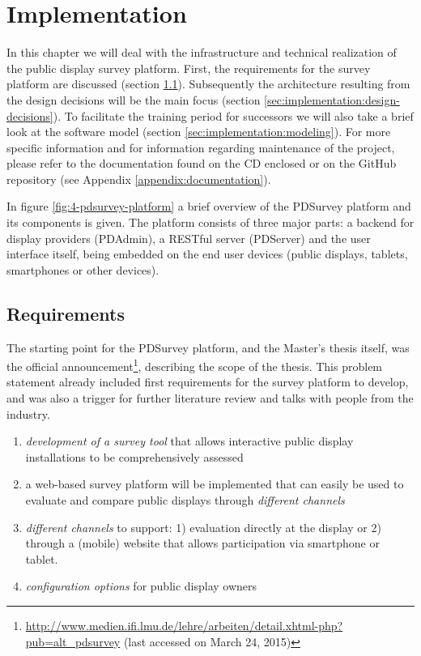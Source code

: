 \section{Implementation}
\label{chapter:implementation}
\label{sec:implementation}

	In this chapter we will deal with the infrastructure and technical realization of the public display survey platform. First, the requirements for the survey platform are discussed (section \ref{sec:implementation:requirements}). Subsequently the architecture resulting from the design decisions will be the main focus (section \ref{sec:implementation:design-decisions}). To facilitate the training period for successors we will also take a brief look at the software model (section \ref{sec:implementation:modeling}). For more specific information and for information regarding maintenance of the project, please refer to the documentation found on the CD enclosed or on the GitHub repository (see Appendix \ref{appendix:documentation}).

	In figure \ref{fig:4-pdsurvey-platform} a brief overview of the PDSurvey platform and its components is given. The platform consists of three major parts: a backend for display providers (PDAdmin), a RESTful server (PDServer) and the user interface itself, being embedded on the end user devices (public displays, tablets, smartphones or other devices). 





\subsection{Requirements}
\label{sec:implementation:requirements}

	The starting point for the PDSurvey platform, and the Master's thesis itself, was the official announcement\footnote{\url{http://www.medien.ifi.lmu.de/lehre/arbeiten/detail.xhtml-php?pub=alt_pdsurvey} (last accessed on March 24, 2015)}, describing the scope of the thesis. This problem statement already included first requirements for the survey platform to develop, and was also a trigger for further literature review and talks with people from the industry.

	\begin{enumerate}[itemsep=0pt] 
	\item \textit{development of a survey tool} that allows interactive public display installations to be comprehensively assessed 
	\item a web-based survey platform will be implemented that can easily be used to evaluate and compare public displays through \textit{different channels} 
	\item \textit{different channels} to support: 1) evaluation directly at
	the display or 2) through a (mobile) website that allows participation via smartphone or tablet.
	\item \textit{configuration options} for public display owners
	\end{enumerate}

